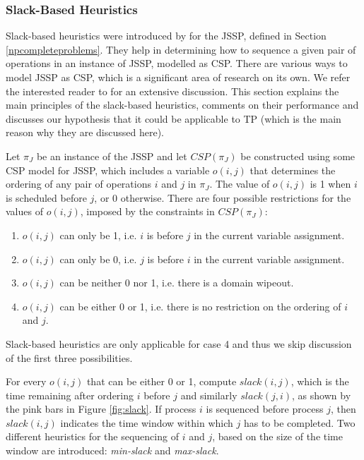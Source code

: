 \documentclass{mprop}
\theoremstyle{definition}
\begin{document}


\subsubsection*{Slack-Based Heuristics}

Slack-based heuristics were introduced by \citet{Smith93} for the JSSP, defined in Section \ref{npcompleteproblems}. They help in determining how to sequence a given pair of operations in an instance of JSSP, modelled as CSP. There are various ways to model JSSP as CSP, which is a significant area of research on its own. We refer the interested reader to \citet[Chapter~22]{cpbible} for an extensive discussion.
This section explains the main principles of the slack-based heuristics, comments on their performance and discusses our hypothesis that it could be applicable to TP (which is the main reason why they are discussed here).

Let $\pi_{J}$ be an instance of the JSSP and let $CSP(\pi_{J})$ be constructed using some CSP model for JSSP, which includes a variable $o(i,j)$ that determines the ordering of any pair of operations $i$ and $j$ in $\pi_{J}$. The value of $o(i,j)$ is 1 when $i$ is scheduled before $j$, or 0 otherwise. There are four possible restrictions for the values of $o(i,j)$, imposed by the constraints in $CSP(\pi_{J})$:

\begin{enumerate}
\item $o(i,j)$ can only be 1, i.e. $i$ is before $j$ in the current variable assignment.
\item $o(i,j)$ can only be 0, i.e. $j$ is before $i$ in the current variable assignment.
\item $o(i,j)$ can be neither 0 nor 1, i.e. there is a domain wipeout.
\item $o(i,j)$ can be either 0 or 1, i.e. there is no restriction on the ordering of $i$ and $j$.
\end{enumerate}
Slack-based heuristics are only applicable for case 4 and thus we skip discussion of the first three possibilities.

For every $o(i,j)$ that can be either 0 or 1, \citet{Smith93} compute $slack(i, j)$, which is the time remaining after ordering $i$ before $j$ and similarly $slack(j, i)$, as shown by the pink bars in Figure \ref{fig:slack}. If process $i$ is sequenced before process $j$, then $slack(i, j)$ indicates the time window within which $j$ has to be completed.
Two different heuristics for the sequencing of $i$ and $j$, based on the size of the time window are introduced: \textit{min-slack} and \textit{max-slack}.
\end{document}

